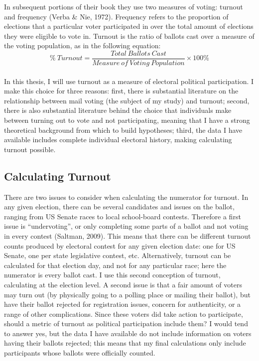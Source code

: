 \documentclass[12pt,twoside]{reedthesis}
\begin{document}
  In subsequent portions of their book they use two measures of voting:
  turnout and frequency (Verba \& Nie, 1972). Frequency refers to the
  proportion of elections that a particular voter participated in over the
  total amount of elections they were eligible to vote in. Turnout is the
  ratio of ballots cast over a measure of the voting population, as in the
  following equation:\\
  \[ \% ~Turnout = \frac{Total~Ballots~Cast}{Measure~of~Voting~Population}\times100\%\]\\
  In this thesis, I will use turnout as a measure of electoral political
  participation. I make this choice for three reasons: first, there is
  substantial literature on the relationship between mail voting (the
  subject of my study) and turnout; second, there is also substantial
  literature behind the choice that individuals make between turning out
  to vote and not participating, meaning that I have a strong theoretical
  background from which to build hypotheses; third, the data I have
  available includes complete individual electoral history, making
  calculating turnout possible.
  
  \subsection{Calculating Turnout}\label{calculating-turnout}
  
  There are two issues to consider when calculating the numerator for
  turnout. In any given election, there can be several candidates and
  issues on the ballot, ranging from US Senate races to local school-board
  contests. Therefore a first issue is ``undervoting'', or only completing
  some parts of a ballot and not voting in every contest (Saltman, 2009).
  This means that there can be different turnout counts produced by
  electoral contest for any given election date: one for US Senate, one
  per state legislative contest, etc. Alternatively, turnout can be
  calculated for that election day, and not for any particular race; here
  the numerator is every ballot cast. I use this second conception of
  turnout, calculating at the election level. A second issue is that a
  fair amount of voters may turn out (by physically going to a polling
  place or mailing their ballot), but have their ballot rejected for
  registration issues, concern for authenticity, or a range of other
  complications. Since these voters did take action to participate, should
  a metric of turnout as political participation include them? I would
  tend to answer yes, but the data I have available do not include
  information on voters having their ballots rejected; this means that my
  final calculations only include participants whose ballots were
  officially counted.
  
\end{document}

